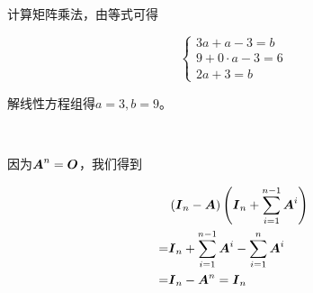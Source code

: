\documentclass{ctexart}
\begin{document}
\begin{problem}\

计算矩阵乘法，由等式可得

\begin{equation*}
    \begin{cases}
        3a+a-3=b       \\
        9+0\cdot a-3=6 \\
        2a+3=b
    \end{cases}
\end{equation*}

解线性方程组得\(a=3,b=9\)。

\end{problem}

\begin{problem}\

因为\(\boldsymbol{A}^n=\boldsymbol{O}\)，我们得到

\begin{align*}
      & \left( \boldsymbol{I}_n-\boldsymbol{A} \right)\left( \boldsymbol{I}_n+\sum_{i=1}^{n-1}\boldsymbol{A}^i \right) \\
    = & \boldsymbol{I}_n+\sum_{i=1}^{n-1}\boldsymbol{A}^i-\sum_{i=1}^n\boldsymbol{A}^i          \\
    = & \boldsymbol{I}_n-\boldsymbol{A}^n=\boldsymbol{I}_n
\end{align*}

\end{problem}
\end{document}

